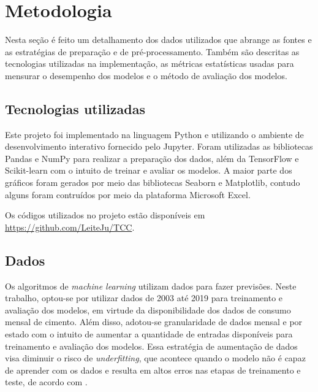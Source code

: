 
\chapter{Metodologia}



Nesta seção é feito um detalhamento dos dados utilizados que 
abrange as fontes e as estratégias de preparação e de pré-processamento. 
Também são descritas as 
tecnologias utilizadas na implementação, as métricas estatísticas 
usadas para mensurar o desempenho dos modelos e o método de
 avaliação dos modelos.

\section{Tecnologias utilizadas}

Este projeto foi implementado na linguagem Python e 
utilizando o ambiente de desenvolvimento interativo fornecido pelo Jupyter.
Foram utilizadas as bibliotecas Pandas e NumPy para realizar a preparação dos dados,
além da TensorFlow e Scikit-learn com o intuito de treinar e avaliar os modelos.
A maior parte dos gráficos foram gerados por meio das bibliotecas 
Seaborn e Matplotlib, contudo alguns foram contruídos por meio da plataforma
Microsoft Excel.

Os códigos utilizados no projeto estão disponíveis em \url{https://github.com/LeiteJu/TCC}.

\section{Dados}
\label{sec:dados}

Os algoritmos de \textit{machine learning} utilizam dados para fazer 
previsões. 
Neste trabalho, optou-se por utilizar dados de 2003 até 2019 para treinamento e 
avaliação dos modelos, em virtude da disponibilidade dos dados de consumo mensal 
de cimento. Além disso,
adotou-se granularidade de dados
mensal e por estado com o intuito de aumentar a quantidade de entradas disponíveis 
para treinamento e avaliação dos modelos.
Essa estratégia de aumentação de dados visa diminuir o risco de  
\textit{underfitting}, que acontece quando o 
modelo não é capaz de aprender com os dados e resulta em altos erros nas etapas de
treinamento e teste, de acordo com \citet{Goodfellow-et-al-2016}.


